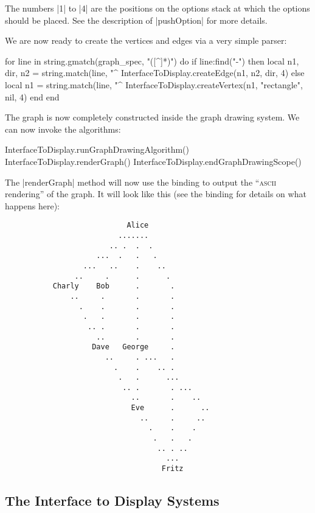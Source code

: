 The numbers |1| to |4| are the positions on the options stack at which
the options should be placed. See the description of |pushOption| for
more details.

We are now ready to create the vertices and edges via a very simple
parser:

\begin{codeexample}
for line in string.gmatch(graph_spec, "([^\n]*)\n") do
  if line:find("-") then
    local n1, dir, n2 = string.match(line, "^%
    InterfaceToDisplay.createEdge(n1, n2, dir, 4)
  else
    local n1 = string.match(line, "^%
    InterfaceToDisplay.createVertex(n1, "rectangle", nil, 4)
  end
end
\end{codeexample}

The graph is now completely constructed inside the graph drawing
system. We can now invoke the algorithms:

\begin{codeexample}
InterfaceToDisplay.runGraphDrawingAlgorithm()
InterfaceToDisplay.renderGraph()
InterfaceToDisplay.endGraphDrawingScope()
\end{codeexample}

The |renderGraph| method will now use the binding to output the
``\textsc{ascii} rendering'' of the graph. It will look like this (see
the binding for details on what happens here):
\begin{verbatim}
                            Alice                            
                          .......                            
                        .. .  .  .                           
                     ...  .   .   .                          
                  ...   ..    .    ..                        
                ..     .      .      .                       
           Charly    Bob      .       .                      
               ..     .       .       .                      
                 .    .       .       .                      
                  .   .       .       .                      
                   .. .       .       .                      
                     ..       .       .                      
                    Dave   George     .                      
                       ..     . ...   .                      
                         .    .    .. .                      
                          .   .      ...                     
                           .. .       . ...                  
                             ..       .    ..                
                             Eve      .      ..              
                               ..     .     ..               
                                 .    .    .                 
                                  .   .   .                  
                                   .. . ..                   
                                     ...                     
                                    Fritz                    
\end{verbatim}



\subsection{The Interface to Display Systems}



